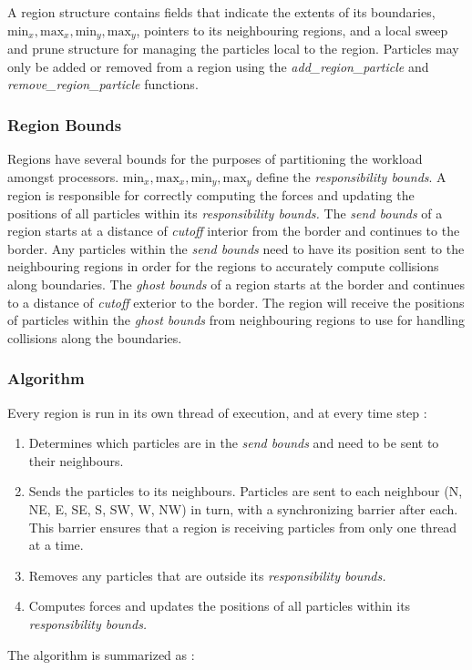 \documentclass[11pt]{article} %
\begin{document}
A region structure contains fields that indicate the extents of its
boundaries, $\text{min}_{x},\text{max}_{x},\text{min}_{y},\text{max}_{y}$,
pointers to its neighbouring regions, and a local sweep and prune
structure for managing the particles local to the region. Particles
may only be added or removed from a region using the \emph{add\_region\_particle
}and \emph{remove\_region\_particle} functions.


\subsubsection{Region Bounds}

Regions have several bounds for the purposes of partitioning the workload
amongst processors. $\text{min}_{x},\text{max}_{x},\text{min}_{y},\text{max}_{y}$
define the \emph{responsibility bounds}. A region is responsible for
correctly computing the forces and updating the positions of all particles
within its \emph{responsibility bounds.} The \emph{send bounds }of
a region starts at a distance of \emph{cutoff }interior from the border
and continues to the border. Any particles within the \emph{send bounds
}need to have its position sent to the neighbouring regions in order
for the regions to accurately compute collisions along boundaries.
The \emph{ghost bounds }of a region starts at the border and continues
to a distance of \emph{cutoff }exterior to the border. The region
will receive the positions of particles within the \emph{ghost bounds}
from neighbouring regions to use for handling collisions along the
boundaries.


\subsubsection{Algorithm}

Every region is run in its own thread of execution, and at every time
step :
\begin{enumerate}
\item Determines which particles are in the \emph{send bounds} and need
to be sent to their neighbours.
\item Sends the particles to its neighbours. Particles are sent to each
neighbour (N, NE, E, SE, S, SW, W, NW) in turn, with a synchronizing
barrier after each. This barrier ensures that a region is receiving particles
from only one thread at a time.
\item Removes any particles that are outside its \emph{responsibility bounds.}
\item Computes forces and updates the positions of all particles within
its \emph{responsibility bounds.}
\end{enumerate}
The algorithm is summarized as :
\end{document}
